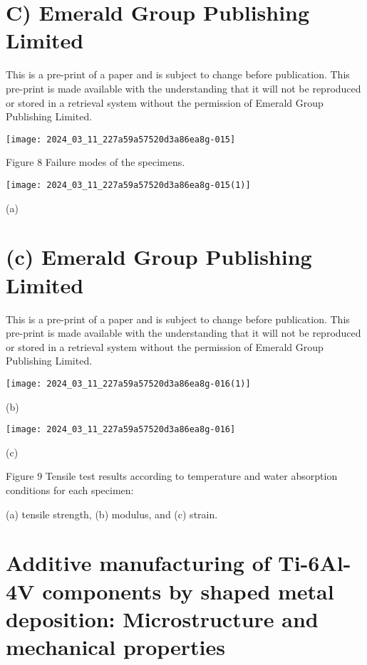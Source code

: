 \documentclass[10pt]{article}
\begin{document}
\section*{C) Emerald Group Publishing Limited}
This is a pre-print of a paper and is subject to change before publication. This pre-print is made available with the understanding that it will not be reproduced or stored in a retrieval system without the permission of Emerald Group Publishing Limited.

\begin{center}
\texttt{[image: 2024\_03\_11\_227a59a57520d3a86ea8g-015]}
\end{center}

Figure 8 Failure modes of the specimens.

\begin{center}
\texttt{[image: 2024\_03\_11\_227a59a57520d3a86ea8g-015(1)]}
\end{center}

(a)

\section*{(c) Emerald Group Publishing Limited}
This is a pre-print of a paper and is subject to change before publication. This pre-print is made available with the understanding that it will not be reproduced or stored in a retrieval system without the permission of Emerald Group Publishing Limited.

\begin{center}
\texttt{[image: 2024\_03\_11\_227a59a57520d3a86ea8g-016(1)]}
\end{center}

(b)

\begin{center}
\texttt{[image: 2024\_03\_11\_227a59a57520d3a86ea8g-016]}
\end{center}

(c)

Figure 9 Tensile test results according to temperature and water absorption conditions for each specimen:

(a) tensile strength, (b) modulus, and (c) strain.

\section*{Additive manufacturing of Ti-6Al-4V components by shaped metal deposition: Microstructure and mechanical properties }
\end{document}
